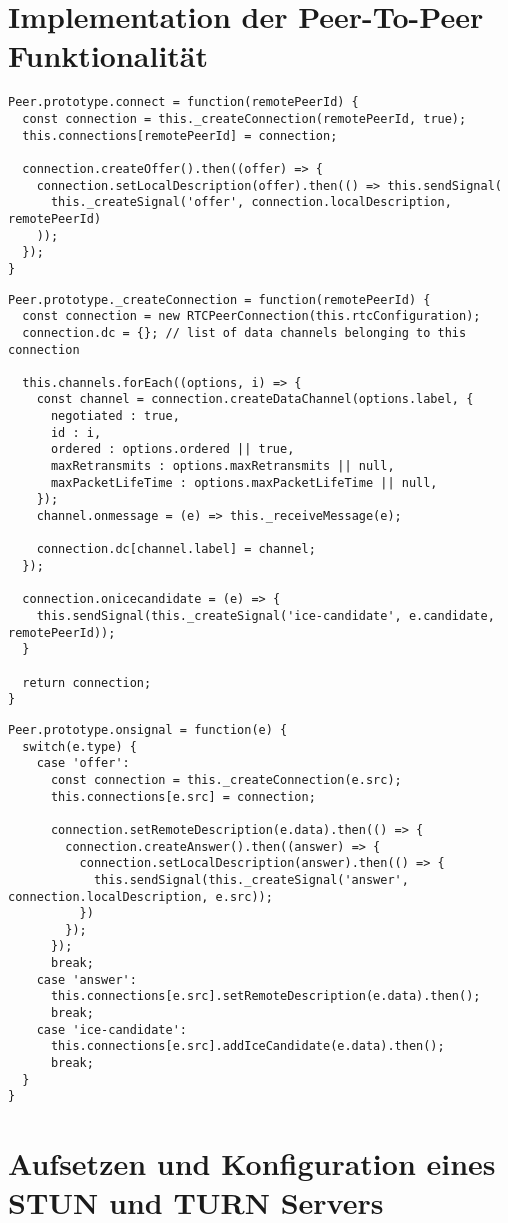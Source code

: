 \section{Implementation der Peer-To-Peer Funktionalität}



\lstset{language=js, style=STYLE_CODE_JS}
\begin{lstlisting}[caption={Javascript LstListing Test}, captionpos=b, label={lst:candidate}]
Peer.prototype.connect = function(remotePeerId) {
  const connection = this._createConnection(remotePeerId, true);
  this.connections[remotePeerId] = connection;

  connection.createOffer().then((offer) => {
    connection.setLocalDescription(offer).then(() => this.sendSignal(
      this._createSignal('offer', connection.localDescription, remotePeerId)
    ));
  });
}
\end{lstlisting}

\begin{lstlisting}[caption={Javascript LstListing Test}, captionpos=b, label={lst:candidate}]
Peer.prototype._createConnection = function(remotePeerId) {
  const connection = new RTCPeerConnection(this.rtcConfiguration);
  connection.dc = {}; // list of data channels belonging to this connection

  this.channels.forEach((options, i) => {
    const channel = connection.createDataChannel(options.label, {
      negotiated : true,
      id : i,
      ordered : options.ordered || true,
      maxRetransmits : options.maxRetransmits || null,
      maxPacketLifeTime : options.maxPacketLifeTime || null,
    });
    channel.onmessage = (e) => this._receiveMessage(e);

    connection.dc[channel.label] = channel;
  });

  connection.onicecandidate = (e) => {
    this.sendSignal(this._createSignal('ice-candidate', e.candidate, remotePeerId));
  }

  return connection;
}
\end{lstlisting}

\begin{lstlisting}[caption={Javascript LstListing Test}, captionpos=b, label={lst:candidate}]
Peer.prototype.onsignal = function(e) {
  switch(e.type) {
    case 'offer':
      const connection = this._createConnection(e.src);
      this.connections[e.src] = connection;

      connection.setRemoteDescription(e.data).then(() => {
        connection.createAnswer().then((answer) => {
          connection.setLocalDescription(answer).then(() => {
            this.sendSignal(this._createSignal('answer', connection.localDescription, e.src));
          })
        });
      });
      break;
    case 'answer':
      this.connections[e.src].setRemoteDescription(e.data).then();
      break;
    case 'ice-candidate':
      this.connections[e.src].addIceCandidate(e.data).then();
      break;
  }
}
\end{lstlisting}

\section{Aufsetzen und Konfiguration eines STUN und TURN Servers}